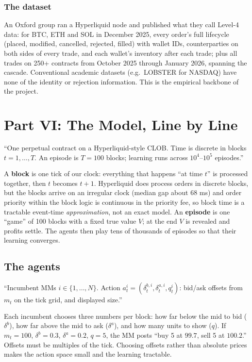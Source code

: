 \documentclass[11pt]{article}
\begin{document}
\subsubsection{The dataset}
An Oxford group ran a Hyperliquid node and published what they call Level-4 data: for BTC, ETH and SOL in December 2025, every order's full lifecycle (placed, modified, cancelled, rejected, filled) with wallet IDs, counterparties on both sides of every trade, and each wallet's inventory after each trade; plus all trades on 250+ contracts from October 2025 through January 2026, spanning the cascade. Conventional academic datasets (e.g.\ LOBSTER for NASDAQ) have none of the identity or rejection information. This is the empirical backbone of the project.

\section{Part VI: The Model, Line by Line}

\begin{deliverable}
``One perpetual contract on a Hyperliquid-style CLOB. Time is discrete in blocks $t=1,\dots,T$. An episode is $T=100$ blocks; learning runs across $10^4$--$10^5$ episodes.''
\end{deliverable}
A \textbf{block} is one tick of our clock: everything that happens ``at time $t$'' is processed together, then $t$ becomes $t+1$. Hyperliquid does process orders in discrete blocks, but the blocks arrive on an irregular clock (median gap about 68 ms) and order priority within the block logic is continuous in the priority fee, so block time is a tractable event-time \emph{approximation}, not an exact model. An \textbf{episode} is one ``game'' of 100 blocks with a fixed true value $V$; at the end $V$ is revealed and profits settle. The agents then play tens of thousands of episodes so that their learning converges.

\subsection{The agents}
\begin{deliverable}
``Incumbent MMs $i\in\{1,\dots,N\}$. Action $a^i_t=(\delta^{b,i}_t,\delta^{a,i}_t,q^i_t)$: bid/ask offsets from $m_t$ on the tick grid, and displayed size.''
\end{deliverable}
Each incumbent chooses three numbers per block: how far below the mid to bid ($\delta^b$), how far above the mid to ask ($\delta^a$), and how many units to show ($q$). If $m_t=100$, $\delta^b=0.3$, $\delta^a=0.2$, $q=5$, the MM posts ``buy 5 at $99.7$, sell 5 at $100.2$.'' Offsets must be multiples of the tick. Choosing offsets rather than absolute prices makes the action space small and the learning tractable.
\end{document}

